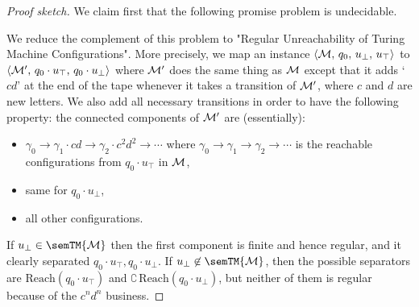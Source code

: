 \begin{proof}[Proof sketch]
  We claim first that the following promise problem is undecidable.

  We reduce the complement of this problem to "Regular Unreachability of Turing Machine Configurations". More precisely, we map an instance
  $\langle \mathcal{M},\, q_0,\, u_\bot,\, u_\top \rangle$ to $\langle \mathcal{M}',\, q_0\cdot u_\top,\, q_0\cdot u_\bot \rangle$ where $\mathcal{M}'$ does the same thing as $\mathcal{M}$ except that it adds `$cd$' at the end of the tape
  whenever it takes a transition of $\mathcal{M}'$, where $c$ and $d$ are new letters.
  We also add all necessary transitions in order to have the following property:
  the connected components of $\mathcal{M}'$ are (essentially):
  \begin{itemize}
    \item $\gamma_0 \to \gamma_1\cdot cd \to \gamma_2\cdot c^2d^2 \to \cdots$
    where $\gamma_0 \to \gamma_1 \to \gamma_2 \to \cdots$ is the reachable configurations from $q_0\cdot u_\top$ in $\mathcal{M}$,
    \item same for $q_0\cdot u_\bot$,
    \item all other configurations.
  \end{itemize}
  If $u_\bot \in \semTM{\+M}$ then the first component is finite and hence regular, and it clearly separated $q_0\cdot u_\top, q_0\cdot u_\bot$.
  If $u_\bot \not\in \semTM{\+M}$, then the possible separators are $\textrm{Reach}(q_0\cdot u_\top)$
  and $\complement\,\textrm{Reach}(q_0\cdot u_\bot)$, but neither of them is regular because of the
  $c^nd^n$ business. 
\end{proof}



\cite{LaroseLotenTardif2007CharacterisationFOCSP}
\cite{LaroseTesson2009UniversalAlgebraCSP}